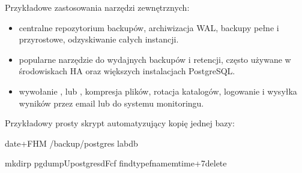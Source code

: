 \documentclass[a4paper,11pt,english,openany,oneside]{sphinxmanual}
\begin{document}
\sphinxAtStartPar
Przykładowe zastosowania narzędzi zewnętrznych:
\begin{itemize}
\item {} 
\sphinxAtStartPar
{} centralne repozytorium backupów, archiwizacja WAL, backupy pełne i przyrostowe, odzyskiwanie całych instancji.

\item {} 
\sphinxAtStartPar
{} popularne narzędzie do wydajnych backupów i retencji, często używane w środowiskach HA oraz większych instalacjach PostgreSQL.

\item {} 
\sphinxAtStartPar
{} wywołanie ,  lub , kompresja plików, rotacja katalogów, logowanie i wysyłka wyników przez e\sphinxhyphen{}mail lub do systemu monitoringu.

\end{itemize}

\sphinxAtStartPar
Przykładowy prosty skrypt automatyzujący kopię jednej bazy:

\begin{sphinxVerbatim}[commandchars=\\\{\}]
date+\PYGZpc{}F\PYGZus{}\PYGZpc{}H\PYGZhy{}\PYGZpc{}M
/backup/postgres
labdb

mkdir\PYGZhy{}p
pg\PYGZus{}dump\PYGZhy{}Upostgres\PYGZhy{}d\PYGZhy{}Fc\PYGZhy{}f
find\PYGZhy{}typef\PYGZhy{}name\PYGZhy{}mtime+7\PYGZhy{}delete
\end{sphinxVerbatim}
\end{document}
